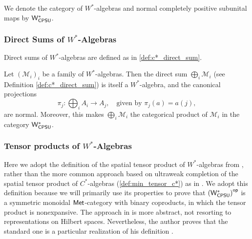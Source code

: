 \begin{definition}
  We denote the category of $W^*$-algebras and normal completely positive subunital maps by $\mathsf{W^*_{CPSU}}$.
\end{definition}

\subsubsection{Direct Sums of $W^*$-Algebras}

Direct sums of $W^*$-algebras are defined as in \autoref{def:c*_direct_sum}.


\begin{proposition} \cite[Exercise 47 IV]{westerbaanCategoryNeumannAlgebras2019}  \label{prop:wcpsu_products}
  Let \( (\mathscr{M}_i)_i \) be a family of $W^*$-algebras. Then the direct sum \( \bigoplus_i \mathscr{M}_i \) (see Definition \ref{def:c*_direct_sum}) is itself a $W^*$-algebra, and the canonical projections
\[
\pi_j : \bigoplus_i A_i \to A_j, \quad \text{given by } \pi_j(a) = a(j),
\]
are normal.
Moreover, this makes \( \bigoplus_i \mathscr{M}_i \) the categorical product of \( \mathscr{M}_i \) in the category $\mathsf{W^*_{CPSU}}$.
\end{proposition}


\subsubsection{Tensor products of $W^*$-Algebras}

Here we adopt the definition of the spatial tensor product of $W^*$-algebras from \cite{westerbaanCategoryNeumannAlgebras2019}, rather than the more common approach based on ultraweak completion of the spatial tensor product of $C^*$-algebras (\autoref{def:min_tensor_c*}) as in \cite{takesakiTheoryOperatorAlgebras1979,sakaiCAlgebrasWAlgebras1998}. We adopt this definition because we will primarily use its properties to prove that $\left(\mathsf{W^*_{CPSU}}\right)^{\mathsf{op}}$ is a symmetric monoidal $\mathsf{Met}$-category with binary coproducts, in which the tensor product is nonexpansive.
The approach in \cite{westerbaanCategoryNeumannAlgebras2019} is more abstract, not resorting to representations on Hilbert spaces. Nevertheless, the author proves that the standard one is a particular realization of his definition  \cite[Theorem 111 VII]{westerbaanCategoryNeumannAlgebras2019}.


